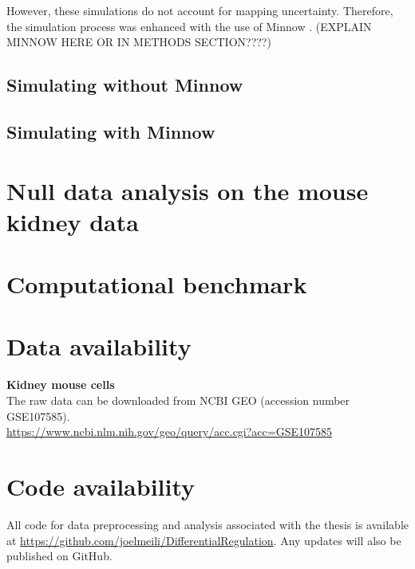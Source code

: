 However, these simulations do not account for mapping uncertainty. Therefore, the simulation process was enhanced with the use of Minnow \citep{minnow}. (EXPLAIN MINNOW HERE OR IN METHODS SECTION????)

\subsection{Simulating without Minnow}

\subsection{Simulating with Minnow}

\section{Null data analysis on the mouse kidney data}

\section{Computational benchmark}

\section{Data availability}

\noindent\textbf{Kidney mouse cells} \\
The raw data can be downloaded from NCBI GEO (accession number GSE107585). \\ 
\url{https://www.ncbi.nlm.nih.gov/geo/query/acc.cgi?acc=GSE107585} \\

\section{Code availability}
All code for data preprocessing and analysis associated with the thesis is available at \url{https://github.com/joelmeili/DifferentialRegulation}. Any updates will also be published on GitHub.
